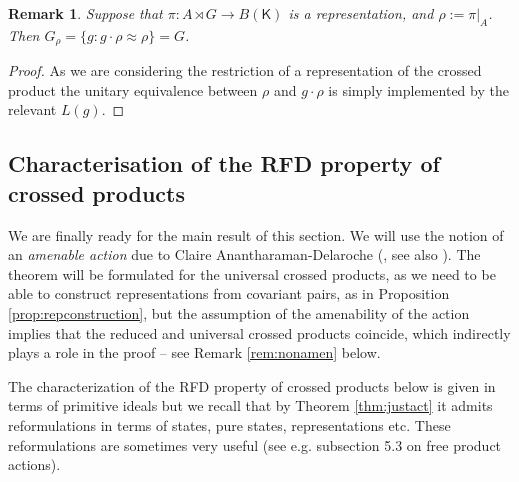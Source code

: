 \documentclass[11 pt, leqno, hidelinks]{amsart}%
\theoremstyle{plain}
\newtheorem{remark}[theorem]{Remark}
\numberwithin{equation}{section}
\newcommand{\Kil}{\mathsf{K}}
\begin{document}
\begin{remark}\label{remark:trivial}
	Suppose that $\pi:A\rtimes G \to B(\Kil)$ is a representation, and $\rho:=\pi|_A$. Then $G_\rho=\{g: g \cdot \rho \approx \rho\}=G$.
\end{remark}
\begin{proof}
	As we are considering the restriction of a representation of the crossed product the unitary equivalence between $\rho$ and $g \cdot \rho$ is simply implemented by the relevant $L(g)$.
\end{proof}


\subsection{Characterisation of the RFD property of crossed products}

We are finally ready for the main result of this section. We will use the notion of an \emph{amenable action} due to Claire Anantharaman-Delaroche (\cite[D\'efinition 4.1]{Claire}, see also \cite{TakaYuhei}). The theorem will be formulated for the universal crossed products, as we need to be able to construct representations from covariant pairs, as in Proposition \ref{prop:repconstruction}, but the assumption of the amenability of the action implies that the reduced and universal crossed products coincide, which indirectly plays a role in the proof -- see Remark \ref{rem:nonamen} below.

The characterization of the RFD property of crossed products below is given in terms of primitive ideals but we recall that by Theorem \ref{thm:justact} it admits reformulations in terms of states, pure states, representations etc. These reformulations are sometimes very useful (see e.g. subsection 5.3 on free product actions).
\end{document}
